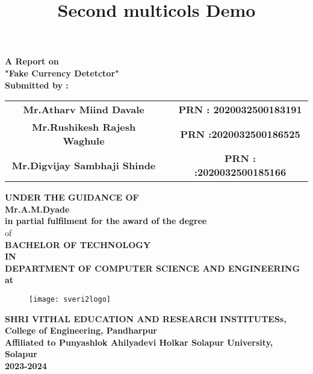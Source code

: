\documentclass[12pt]{article}
\title{Second multicols Demo}
\begin{document}
 \begin{center}
 \large \textbf {A Report on}\\[2mm]
 \LARGE \textbf {"Fake Currency Detetctor"}\\[7mm]
 
 \textbf{Submitted by :}\\[2mm]
 \end{center}
 
 
 \begin{tabular}{ c c c } 
 \textbf{Mr.Atharv Miind Davale} & \hspace{1.1in} & \textbf{ PRN :  2020032500183191} \\ [1mm] 
 \textbf {Mr.Rushikesh Rajesh Waghule} & \hspace{1.1in} & \textbf{PRN :2020032500186525}\\[1mm]
 \textbf{ Mr.Digvijay Sambhaji Shinde } & \hspace{1.1in}  & \textbf{PRN : :2020032500185166}\\[7mm]
 \end{tabular} 
 
 
 
 \begin{center}
 \large \textbf {UNDER THE GUIDANCE OF }\\[2mm]
 \large \textbf {Mr.A.M.Dyade}\\[7mm]
 \textbf {in partial fulfilment for the award of the degree} \\[2mm] of \\[2mm]
 
 \large \textbf {BACHELOR OF TECHNOLOGY}\\[2mm]
 \textbf {IN}\\[2mm]
 \textbf {DEPARTMENT OF COMPUTER SCIENCE AND ENGINEERING}\\
 \textbf {at}
 \end{center}
 
 \begin{figure}[h]
 \centering
 \texttt{[image: sveri2logo]}
\end{figure} 

\begin{center}
\textbf{SHRI VITHAL EDUCATION AND RESEARCH INSTITUTESs,\\[2mm]
College of Engineering, Pandharpur\\[3mm]
Affiliated to Punyashlok Ahilyadevi Holkar Solapur University, Solapur\\[2mm]
2023-2024}
\end{center}  
 
\end{document}
